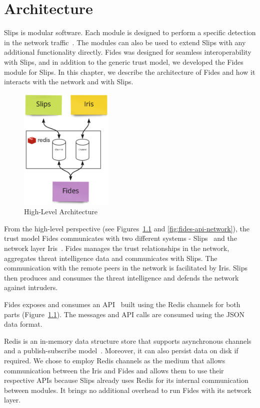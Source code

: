 \chapter{Architecture}
\label{ch:architecture}
Slips is modular software. Each module is designed to perform a specific detection in the network traffic~\cite{slips}.
The modules can also be used to extend Slips with any additional functionality directly. 
Fides was designed for seamless interoperability with Slips, and in addition to the generic trust model, we developed the Fides module for Slips.
In this chapter, we describe the architecture of Fides and how it interacts with the network and with Slips.

\begin{figure}[ht]
    \centering
    \includegraphics[width=0.4\textwidth]{assets/redis_channels.jpeg}
    \caption{High-Level Architecture}
    \label{fig:high-level-architecture}
\end{figure}

From the high-level perspective (see Figures~\ref{fig:high-level-architecture} and \ref{fig:fides-api-network}), the trust model Fides  communicates with two different systems - Slips~\cite{slips} and the network layer Iris~\cite{nl}.
Fides manages the trust relationships in the network, aggregates threat intelligence data and communicates with Slips. The communication with the remote peers in the network is facilitated by Iris. 
Slips then produces and consumes the threat intelligence and defends the network against intruders.

Fides exposes and consumes an API~\cite{api} built using the Redis channels for both parts (Figure~\ref{fig:high-level-architecture}).
The messages and API calls are consumed using the JSON~\cite{json} data format.

Redis is an in-memory data structure store that supports asynchronous channels and a publish-subscribe model~\cite{redis}. Moreover, it can also persist data on disk if required.
We chose to employ Redis channels as the medium that allows communication between the Iris and Fides and allows them to use their respective APIs because Slips already uses Redis for its internal communication between modules. It brings no additional overhead to run Fides with its network layer.



